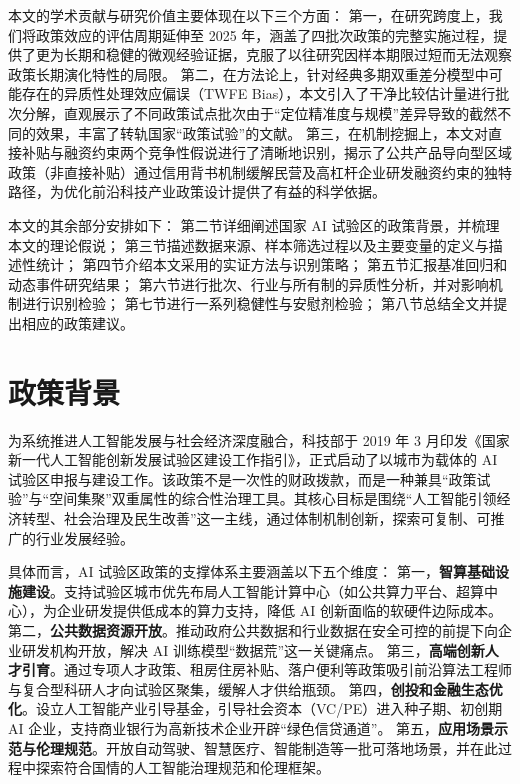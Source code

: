 \documentclass[12pt,hyperref,a4paper,UTF8]{ctexart}
\begin{document}
本文的学术贡献与研究价值主要体现在以下三个方面：
第一，在研究跨度上，我们将政策效应的评估周期延伸至 2025 年，涵盖了四批次政策的完整实施过程，提供了更为长期和稳健的微观经验证据，克服了以往研究因样本期限过短而无法观察政策长期演化特性的局限。
第二，在方法论上，针对经典多期双重差分模型中可能存在的异质性处理效应偏误（TWFE Bias），本文引入了干净比较估计量进行批次分解，直观展示了不同政策试点批次由于“定位精准度与规模”差异导致的截然不同的效果，丰富了转轨国家“政策试验”的文献。
第三，在机制挖掘上，本文对直接补贴与融资约束两个竞争性假说进行了清晰地识别，揭示了公共产品导向型区域政策（非直接补贴）通过信用背书机制缓解民营及高杠杆企业研发融资约束的独特路径，为优化前沿科技产业政策设计提供了有益的科学依据。

本文的其余部分安排如下：
第二节详细阐述国家 AI 试验区的政策背景，并梳理本文的理论假说；
第三节描述数据来源、样本筛选过程以及主要变量的定义与描述性统计；
第四节介绍本文采用的实证方法与识别策略；
第五节汇报基准回归和动态事件研究结果；
第六节进行批次、行业与所有制的异质性分析，并对影响机制进行识别检验；
第七节进行一系列稳健性与安慰剂检验；
第八节总结全文并提出相应的政策建议。

\section{政策背景}

为系统推进人工智能发展与社会经济深度融合，科技部于 2019 年 3 月印发《国家新一代人工智能创新发展试验区建设工作指引》，正式启动了以城市为载体的 AI 试验区申报与建设工作。该政策不是一次性的财政拨款，而是一种兼具“政策试验”与“空间集聚”双重属性的综合性治理工具。其核心目标是围绕“人工智能引领经济转型、社会治理及民生改善”这一主线，通过体制机制创新，探索可复制、可推广的行业发展经验。

具体而言，AI 试验区政策的支撑体系主要涵盖以下五个维度：
第一，\textbf{智算基础设施建设}。支持试验区城市优先布局人工智能计算中心（如公共算力平台、超算中心），为企业研发提供低成本的算力支持，降低 AI 创新面临的软硬件边际成本。
第二，\textbf{公共数据资源开放}。推动政府公共数据和行业数据在安全可控的前提下向企业研发机构开放，解决 AI 训练模型“数据荒”这一关键痛点。
第三，\textbf{高端创新人才引育}。通过专项人才政策、租房住房补贴、落户便利等政策吸引前沿算法工程师与复合型科研人才向试验区聚集，缓解人才供给瓶颈。
第四，\textbf{创投和金融生态优化}。设立人工智能产业引导基金，引导社会资本（VC/PE）进入种子期、初创期 AI 企业，支持商业银行为高新技术企业开辟“绿色信贷通道”。
第五，\textbf{应用场景示范与伦理规范}。开放自动驾驶、智慧医疗、智能制造等一批可落地场景，并在此过程中探索符合国情的人工智能治理规范和伦理框架。
\end{document}
